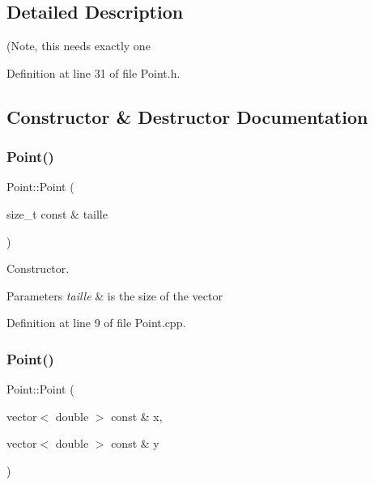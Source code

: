 \subsection{Detailed Description}
(Note, this needs exactly one 

Definition at line 31 of file Point.\+h.



\subsection{Constructor \& Destructor Documentation}
\mbox{\label{class_point_a44d490126797f9e88de376fb6814b089}} 
\subsubsection{\texorpdfstring{Point()}{Point()}\hspace{0.1cm}{\footnotesize\ttfamily [1/2]}}
{\footnotesize\ttfamily Point\+::\+Point (\begin{DoxyParamCaption}\item[{size\+\_\+t const \&}]{taille }\end{DoxyParamCaption})\hspace{0.3cm}{\ttfamily [explicit]}}



Constructor. 


\begin{DoxyParams}{Parameters}
{\em taille} & is the size of the vector \\
\hline
\end{DoxyParams}


Definition at line 9 of file Point.\+cpp.

\mbox{\label{class_point_a64da1fdafc9131972f1458ef9bd5de30}} 
\subsubsection{\texorpdfstring{Point()}{Point()}\hspace{0.1cm}{\footnotesize\ttfamily [2/2]}}
{\footnotesize\ttfamily Point\+::\+Point (\begin{DoxyParamCaption}\item[{vector$<$ double $>$ const \&}]{x,  }\item[{vector$<$ double $>$ const \&}]{y }\end{DoxyParamCaption})}



